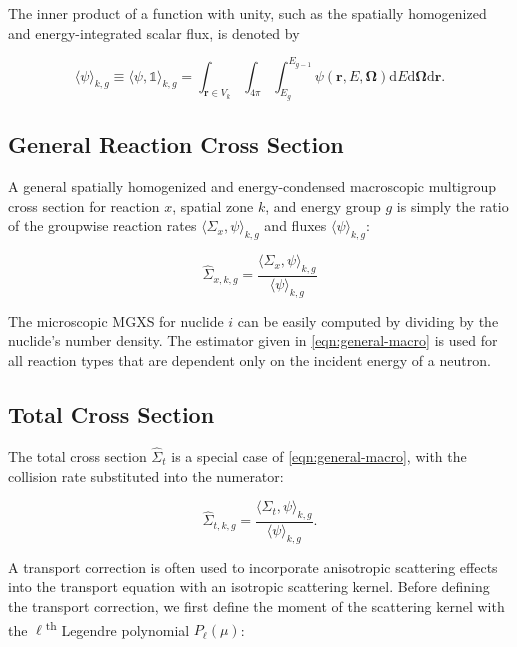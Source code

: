 \noindent The inner product of a function with unity, such as the spatially homogenized and energy-integrated scalar flux, is denoted by

\begin{equation}
\label{eqn:angle-flux}
\langle \psi \rangle_{k,g} \equiv \langle \psi, \mathbb{1} \rangle_{k,g} = \int_{\mathbf{r} \in V_{k}} \int_{4\pi} \int_{E_{g}}^{E_{g-1}} \psi(\mathbf{r},E,\mathbf{\Omega}) \mathrm{d}E\mathrm{d}\mathbf{\Omega}\mathrm{d}\mathbf{r}.
\end{equation}

\subsection{General Reaction Cross Section}
\label{subsubsec:tally-types-gen-xs}

A general spatially homogenized and energy-condensed macroscopic multigroup cross section for reaction $x$, spatial zone $k$, and energy group $g$ is simply the ratio of the groupwise reaction rates $\langle \Sigma_{x}, \psi \rangle_{k,g}$ and fluxes $\langle \psi \rangle_{k,g}$:

\begin{equation}
\label{eqn:general-macro}
\hat{\Sigma}_{x,k,g} = \frac{\langle \Sigma_{x}, \psi \rangle_{k,g}}{\langle \psi \rangle_{k,g}}
\end{equation}

\noindent The microscopic MGXS for nuclide $i$ can be easily computed by dividing by the nuclide's number density. The estimator given in \cref{eqn:general-macro} is used for all reaction types that are dependent only on the incident energy of a neutron.

\subsection{Total Cross Section}
\label{subsubsec:tally-types-tot-xs}

The total cross section $\hat{\Sigma}_{t}$ is a special case of \cref{eqn:general-macro}, with the collision rate substituted into the numerator:

\begin{equation}
\label{eqn:total-macro}
\hat{\Sigma}_{t,k,g} = \frac{\langle \Sigma_{t}, \psi \rangle_{k,g}}{\langle \psi \rangle_{k,g}}.
\end{equation}

A transport correction is often used to incorporate anisotropic scattering effects into the transport equation with an isotropic scattering kernel. Before defining the transport correction, we first define the moment of the scattering kernel with the $\ell$\textsuperscript{th} Legendre polynomial $P_{\ell}(\mu)$:

